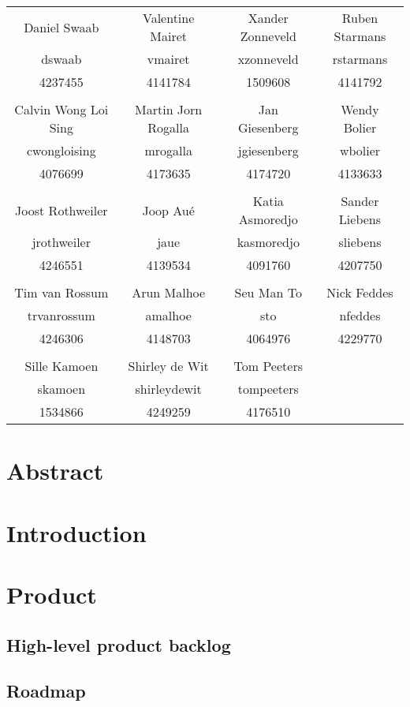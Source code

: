 \documentclass{article}
\begin{document}
\begin{tabular}{cccc}
Daniel Swaab & Valentine Mairet & Xander Zonneveld & Ruben Starmans\\
dswaab & vmairet & xzonneveld & rstarmans\\
4237455 & 4141784 & 1509608 & 4141792\\
&&&\\
Calvin Wong Loi Sing & Martin Jorn Rogalla & Jan Giesenberg & Wendy Bolier\\
cwongloising & mrogalla & jgiesenberg & wbolier\\
4076699 & 4173635 & 4174720 & 4133633\\
&&&\\
Joost Rothweiler & Joop Au\'{e} & Katia Asmoredjo & Sander Liebens\\
jrothweiler & jaue & kasmoredjo & sliebens\\
4246551 & 4139534 & 4091760 & 4207750\\
&&&\\
Tim van Rossum & Arun Malhoe & Seu Man To & Nick Feddes\\
trvanrossum & amalhoe & sto & nfeddes\\
4246306 & 4148703 & 4064976 & 4229770\\
&&&\\
Sille Kamoen & Shirley de Wit & Tom Peeters &\\
skamoen & shirleydewit & tompeeters &\\
1534866 & 4249259 & 4176510 &
\end{tabular}
\pagebreak
\section*{Abstract}

\pagebreak
\tableofcontents
\pagebreak
\section{Introduction}


\section{Product}
\subsection{High-level product backlog}
\subsection{Roadmap}
\end{document}
